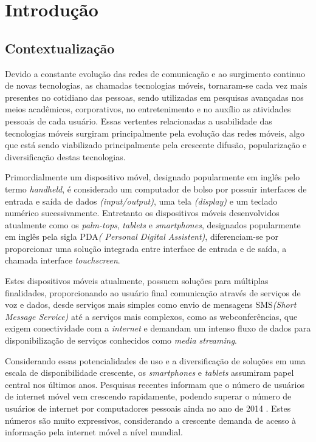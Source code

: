 \chapter{Introdução} %
\label{cha:chapter_name}

\section{Contextualização} %
\label{sec:contextualizacao}
Devido a constante evolução das redes de comunicação e ao surgimento continuo de
novas tecnologias, as chamadas tecnologias móveis, tornaram-se cada vez mais
presentes no cotidiano das pessoas, sendo utilizadas em pesquisas avançadas nos
meios acadêmicos, corporativos, no entretenimento e no auxílio as atividades
pessoais de cada usuário. Essas vertentes relacionadas a usabilidade
das tecnologias móveis surgiram principalmente pela evolução das redes
móveis, algo que está sendo viabilizado principalmente pela crescente difusão,
popularização e diversificação destas tecnologias.

Primordialmente um dispositivo móvel, designado popularmente em inglês pelo termo
\textit{handheld}, é considerado um computador de bolso por possuir interfaces
de entrada e saída de dados \textit{(input/output)}, uma tela \textit{(display)}
e um teclado numérico sucessivamente. Entretanto os dispositivos móveis
desenvolvidos atualmente como os \textit{palm-tops}, \textit{tablets} e
\textit{smartphones}, designados popularmente em inglês pela sigla PDA\textit{(
Personal Digital Assistent)}, diferenciam-se por proporcionar uma solução
integrada entre interface de entrada e de saída, a chamada interface
\textit{touchscreen}.

Estes dispositivos móveis atualmente, possuem soluções para múltiplas finalidades,
proporcionando ao usuário final comunicação através de serviços de voz e dados,
desde serviços mais simples como envio de mensagens SMS\textit{(Short Message
Service)} até a serviços mais complexos, como as webconferências, que exigem
conectividade com a \textit{internet} e demandam um intenso fluxo de dados para
disponibilização de serviços conhecidos como \textit{media streaming}.

Considerando essas potencialidades de uso e a diversificação de soluções em uma
escala de disponibilidade crescente, os \textit{smartphones} e \textit{tablets}
assumiram papel central nos últimos anos. Pesquisas recentes informam que o
número de usuários de internet móvel vem crescendo rapidamente, podendo superar
o número de usuários de internet por computadores pessoais ainda no ano de 2014
\cite{devitt2010meeker}. Estes números são muito expressivos, considerando a
crescente demanda de acesso à informação pela internet móvel a nível mundial.
